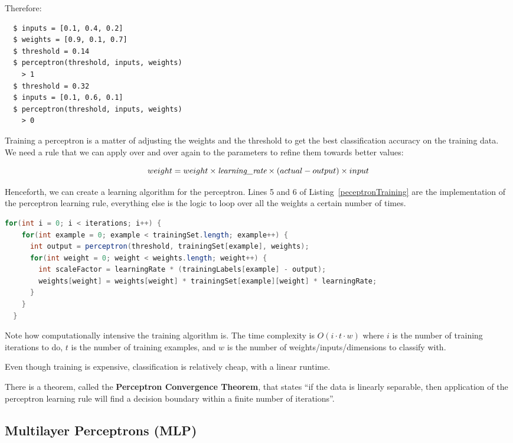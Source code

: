 Therefore:

\begin{verbatim}
  $ inputs = [0.1, 0.4, 0.2]
  $ weights = [0.9, 0.1, 0.7]
  $ threshold = 0.14
  $ perceptron(threshold, inputs, weights)
    > 1
  $ threshold = 0.32
  $ inputs = [0.1, 0.6, 0.1]
  $ perceptron(threshold, inputs, weights)
    > 0
\end{verbatim}

Training a perceptron is a matter of adjusting the weights and the threshold to
get the best classification accuracy on the training data. We need a rule that
we can apply over and over again to the parameters to refine them towards better
values:

\[
  weight = weight \times \text{\it learning\_rate} \times (actual - output) \times input
\]

Henceforth, we can create a learning algorithm for the perceptron. Lines 5 and 6
of Listing~\ref{peceptronTraining} are the implementation of the perceptron
learning rule, everything else is the logic to loop over all the weights a
certain number of times.

\begin{lstlisting}[language=java, label=perceptronTraining,
                   caption=A perceptron learning algorithm in Java]
  for(int i = 0; i < iterations; i++) {
    for(int example = 0; example < trainingSet.length; example++) {
      int output = perceptron(threshold, trainingSet[example], weights);
      for(int weight = 0; weight < weights.length; weight++) {
        int scaleFactor = learningRate * (trainingLabels[example] - output);
        weights[weight] = weights[weight] * trainingSet[example][weight] * learningRate;
      }
    }
  }
\end{lstlisting}

Note how computationally intensive the training algorithm is. The time
complexity is $O(i \cdot t \cdot w)$ where $i$ is the number of training
iterations to do, $t$ is the number of training examples, and $w$ is the number
of weights/inputs/dimensions to classify with.

Even though training is expensive, classification is relatively cheap, with a
linear runtime.

There is a theorem, called the \textbf{Perceptron Convergence Theorem}, that
states ``if the data is linearly separable, then application of the perceptron
learning rule will find a decision boundary within a finite number of
iterations''.

\subsection{Multilayer Perceptrons (MLP)}


